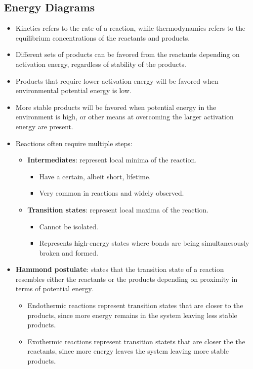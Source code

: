 \documentclass[12pt,a4paper]{article}
\begin{document}
\subsection{Energy Diagrams}
\begin{itemize}
    \item Kinetics refers to the rate of a reaction, while thermodynamics refers to the equilibrium concentrations of the reactants and products.
    \item Different sets of products can be favored from the reactants depending on activation energy, regardless of stability of the products.
    \item Products that require lower activation energy will be favored when environmental potential energy is low.
    \item More stable products will be favored when potential energy in the environment is high, or other means at overcoming the larger activation energy are present.
    \item Reactions often require multiple steps:
        \begin{itemize}
            \item \textbf{Intermediates}: represent local minima of the reaction.
                \begin{itemize}
                    \item Have a certain, albeit short, lifetime.
                    \item Very common in reactions and widely observed.
                \end{itemize}
            \item \textbf{Transition states}: represent local maxima of the reaction.
                \begin{itemize}
                    \item Cannot be isolated.
                    \item Represents high-energy states where bonds are being simultanesously broken and formed.
                \end{itemize}
        \end{itemize}
    \item \textbf{Hammond postulate}: states that the transition state of a reaction resembles either the reactants or the products depending on proximity in terms of potential energy.
        \begin{itemize}
            \item {\color{pos}Endothermic} reactions represent transition states that are closer to the products, since more energy {\color{pos}remains} in the system leaving {\color{pos}less stable} products. 
            \item {\color{neg}Exothermic} reactions represent transition statets that are closer the the reactants, since more energy {\color{neg}leaves} the system leaving {\color{neg}more stable} products.
        \end{itemize}
\end{itemize}
\end{document}
